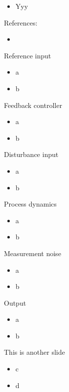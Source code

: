 \documentclass{beamer-control}
\begin{document}

\begin{SUMMARY}
\begin{itemize}
\item Yyy
\end{itemize}
\vfill References:
\begin{itemize}
\item {}
\end{itemize}
\end{SUMMARY}




\begin{frame}{Reference input}
\begin{itemize}
\item a
\item b
\end{itemize}
\end{frame}

\begin{frame}{Feedback controller}
\begin{itemize}
\item a
\item b
\end{itemize}
\end{frame}

\begin{frame}{Disturbance input}
\begin{itemize}
\item a
\item b
\end{itemize}
\end{frame}

\begin{frame}{Process dynamics}
\begin{itemize}
\item a
\item b
\end{itemize}
\end{frame}

\begin{frame}{Measurement noise}
\begin{itemize}
\item a
\item b
\end{itemize}
\end{frame}

\begin{frame}{Output}
\begin{itemize}
\item a
\item b
\end{itemize}
\end{frame}


\begin{frame}{This is another slide}
\begin{itemize}
\item c
\item d
\end{itemize}
\end{frame}


\SUMMARYFRAME
\FINALE
\end{document}
